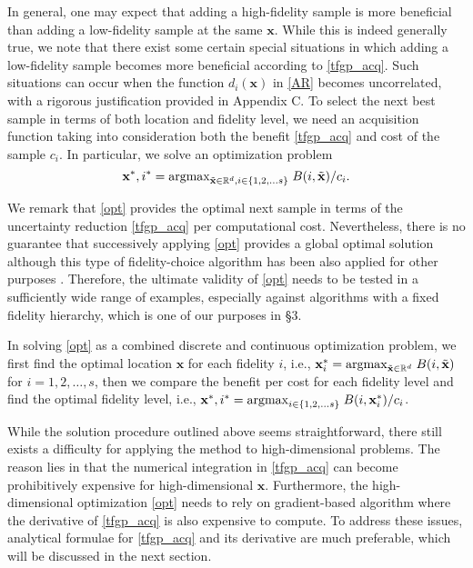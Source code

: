 \documentclass[11pt]{article}
\begin{document}
In general, one may expect that adding a high-fidelity sample is more beneficial than adding a low-fidelity sample at the same $\mathbf{x}$. While this is indeed generally true, we note that there exist some certain special situations in which adding a low-fidelity sample becomes more beneficial according to \eqref{tfgp_acq}. Such situations can occur when the function $d_i(\mathbf{x})$ in \eqref{AR} becomes uncorrelated, with a rigorous justification provided in Appendix C. To select the next best sample in terms of both location and fidelity level, we need an acquisition function taking into consideration both the benefit \eqref{tfgp_acq} and cost of the sample $c_i$. In particular, we solve an optimization problem
\begin{equation}
    \mathbf{x}^*, i^* = {\rm{argmax}}_{\tilde{\mathbf{x}} \in  \mathbb{R}^{d}, i \in \{1, 2, \dots s\}} \; B(i,\tilde{\mathbf{x}}) / c_i.
\label{opt}
\end{equation}

We remark that \eqref{opt} provides the optimal next sample in terms of the uncertainty reduction \eqref{tfgp_acq} per computational cost. Nevertheless, there is no guarantee that successively applying \eqref{opt} provides a global optimal solution although this type of fidelity-choice algorithm has been also applied for other purposes \cite{marques2018contour, marco2017virtual}. Therefore, the ultimate validity of \eqref{opt} needs to be tested in a sufficiently wide range of examples, especially against algorithms with a fixed fidelity hierarchy, which is one of our purposes in \S3.  

In solving \eqref{opt} as a combined discrete and continuous optimization problem, we first find the optimal location $\mathbf{x}$ for each fidelity $i$, i.e., $\mathbf{x}_i^*= {\rm{argmax}}_{\tilde{\mathbf{x}} \in  \mathbb{R}^{d}} \; B(i,\tilde{\mathbf{x}})$ for $i=1,2,\dots,s$, then we compare the benefit per cost for each fidelity level and find the optimal fidelity level, i.e., $\mathbf{x}^*, i^*= {\rm{argmax}}_{i \in \{1,2, \dots s\}} \; B(i,\mathbf{x}_i^*) / c_i$. 

While the solution procedure outlined above seems straightforward, there still exists a difficulty for applying the method to high-dimensional problems. The reason lies in that the numerical integration in \eqref{tfgp_acq} can become prohibitively expensive for high-dimensional $\mathbf{x}$. Furthermore, the high-dimensional optimization \eqref{opt} needs to rely on gradient-based algorithm where the derivative of \eqref{tfgp_acq} is also expensive to compute. To address these issues, analytical formulae for \eqref{tfgp_acq} and its derivative are much preferable, which will be discussed in the next section.
\end{document}
